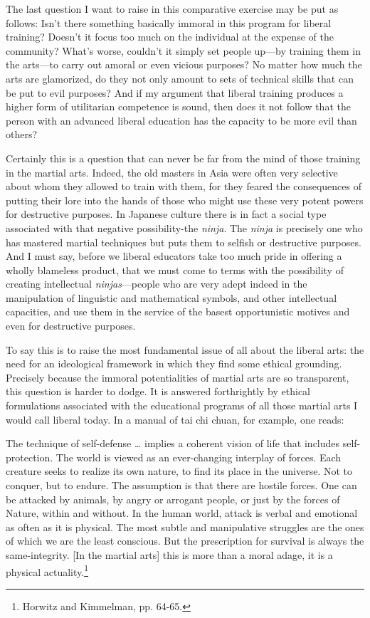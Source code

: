 The last question I want to raise in this comparative exercise may be put as follows: Isn't there something basically immoral in this program for liberal training? Doesn't it focus too much on the individual at the expense of the community? What's worse, couldn't it simply set people up---by training them in the arts---to carry out amoral or even vicious purposes? No matter how much the arts are glamorized, do they not only amount to sets of technical skills that can be put to evil purposes? And if my argument that liberal training produces a higher form of utilitarian competence is sound, then does it not follow that the person with an advanced liberal education has the capacity to be more evil than others?

Certainly this is a question that can never be far from the mind of those training in the martial arts. Indeed, the old masters in Asia were often very selective about whom they allowed to train with them, for they feared the consequences of putting their lore into the hands of those who might use these very potent powers for destructive purposes. In Japanese culture there is in fact a social type associated with that negative possibility-the \emph{ninja}. The \emph{ninja} is precisely one who has mastered martial techniques but puts them to selfish or destructive purposes. And I must say, before we liberal educators take too much pride in offering a wholly blameless product, that we must come to terms with the possibility of creating intellectual \emph{ninjas}---people who are very adept indeed in the manipulation of linguistic and mathematical symbols, and other intellectual capacities, and use them in the service of the basest opportunistic motives and even for destructive purposes. 

To say this is to raise the most fundamental issue of all about the liberal arts: the need for an ideological framework in which they find some ethical grounding. Precisely because the immoral potentialities of martial arts are so transparent, this question is harder to dodge. It is answered forthrightly by ethical formulations associated with the educational programs of all those martial arts I would call liberal today. In a manual of tai chi chuan, for example, one reads: 

The technique of self-defense \ldots{} implies a coherent vision of life that includes self-protection. The world is viewed as an ever-changing interplay of forces. Each creature seeks to realize its own nature, to find its place in the universe. Not to conquer, but to endure. The assumption is that there are hostile forces. One can be attacked by animals, by angry or arrogant people, or just by the forces of Nature, within and without. In the human world, attack is verbal and emotional as often as it is physical. The most subtle and manipulative struggles are the ones of which we are the least conscious. But the prescription for survival is always the same-integrity. [In the martial arts] this is more than a moral adage, it is a physical actuality.\footnote{Horwitz and Kimmelman, pp. 64-65.}

